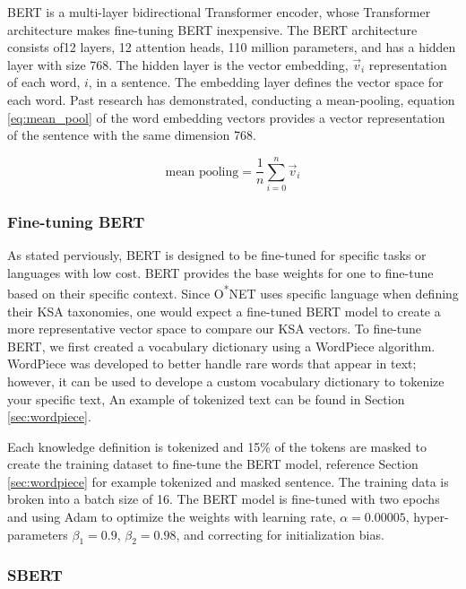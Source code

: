 \documentclass[12pt]{article}
\begin{document}
BERT is a multi-layer bidirectional Transformer encoder, whose Transformer architecture makes fine-tuning BERT inexpensive.\cite{bert} The BERT architecture consists of12 layers, 12 attention heads, 110 million parameters, and has a hidden layer with size 768.\cite{bert} The hidden layer is the vector embedding, $\vec{v}_i$ representation of each word, $i$, in a sentence. The embedding layer defines the vector space for each word. Past research has demonstrated, conducting a mean-pooling, equation \ref{eq:mean_pool} of the word embedding vectors provides a vector representation of the sentence with the same dimension 768.\cite{labor_space, sbert}

\begin{equation}
    \text{mean pooling} = \frac{1}{n}\sum_{i=0}^n \vec{v}_i
    \label{eq:mean_pool}
\end{equation}

\subsubsection{Fine-tuning BERT}

As stated perviously, BERT is designed to be fine-tuned for specific tasks or languages with low cost. BERT provides the base weights for one to fine-tune based on their specific context. Since O\textsuperscript{*}NET uses specific language when defining their KSA taxonomies, one would expect a fine-tuned BERT model to create a more representative vector space to compare our KSA vectors. To fine-tune BERT, we first created a vocabulary dictionary using a WordPiece algorithm. WordPiece was developed to better handle rare words that appear in text; however, it can be used to develope a custom vocabulary dictionary to tokenize your specific text\cite{wordpiece}, An example of tokenized text can be found in Section \ref{sec:wordpiece}.

Each knowledge definition is tokenized and 15\% of the tokens are masked to create the training dataset to fine-tune the BERT model, reference Section \ref{sec:wordpiece} for example tokenized and masked sentence. The training data is broken into a batch size of 16. The BERT model is fine-tuned with two epochs and using Adam to optimize the weights with learning rate, $\alpha = 0.00005$, hyper-parameters $\beta_1 = 0.9$, $\beta_2 = 0.98$, and correcting for initialization bias.\cite{kingma2017adam}

\subsubsection{SBERT}
\end{document}
